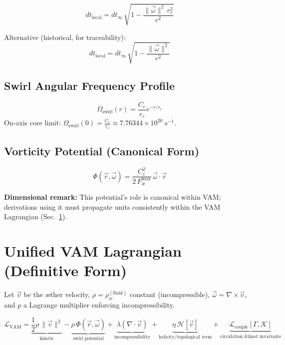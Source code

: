 \documentclass[11pt]{article}
\begin{document}
\begin{equation}
dt_{\text{local}} = dt_{\infty}\,\sqrt{1 - \frac{\lVert\vec{\omega}\rVert^{2}\,r_c^{2}}{c^{2}}}
\end{equation}

Alternative (historical, for traceability):
\begin{equation}
dt_{\text{local}} = dt_{\infty}\,\sqrt{1 - \frac{\lVert\vec{\omega}\rVert^{2}}{c^{2}}}
\end{equation}

\subsection{Swirl Angular Frequency Profile}

\begin{equation}
\Omega_{\text{swirl}}(r) = \frac{C_e}{r_c} e^{-r/r_c}
\end{equation}
On-axis core limit: $\Omega_{\text{swirl}}(0)=\frac{C_e}{r_c}\approx 7.76344\times10^{20}\;\text{s}^{-1}$.

\subsection{Vorticity Potential (Canonical Form)}

\begin{equation}
\Phi(\vec r,\vec\omega) = \frac{C_e^{2}}{2\,F_{\text{\ae}}^{\max}}\,\vec\omega\cdot\vec r
\end{equation}

\textbf{Dimensional remark:} This potential’s role is canonical within VAM; derivations using it must propagate units consistently within the VAM Lagrangian (Sec.~\ref{sec:lagrangian}).

\section{Unified VAM Lagrangian (Definitive Form)}
\label{sec:lagrangian}

Let $\vec v$ be the æther velocity, $\rho=\rho_{\text{\ae}}^{(\text{fluid})}$ constant (incompressible), $\vec\omega=\nabla\times\vec v$, and $p$ a Lagrange multiplier enforcing incompressibility.

\begin{equation}
\mathcal{L}_{\text{VAM}} =
\underbrace{\frac{1}{2}\rho\,\lVert\vec v\rVert^{2}}_{\text{kinetic}}
- \underbrace{\rho\,\Phi(\vec r,\vec\omega)}_{\text{swirl potential}}
+ \underbrace{\lambda(\nabla\cdot\vec v)}_{\text{incompressibility}}
+ \underbrace{\eta\,\mathcal{H}[\vec v]}_{\text{helicity/topological term}}
+ \underbrace{\mathcal{L}_{\text{couple}}[\Gamma,\mathcal{K}]}_{\text{circulation \& knot invariants}}
\end{equation}
\end{document}
